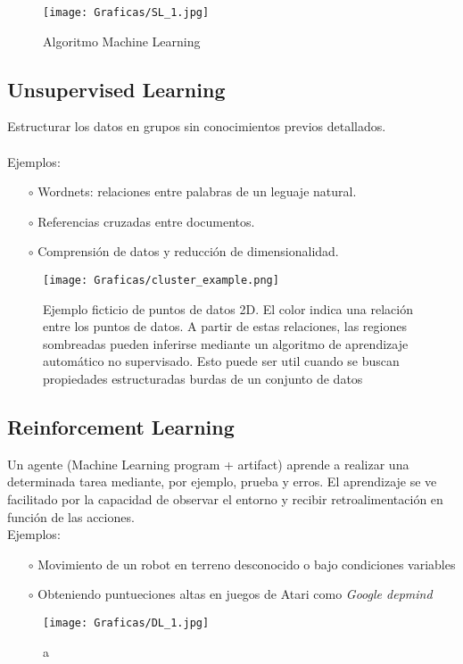 \documentclass[12pt,a4paper]{book}
\begin{document}
\begin{figure}[hbtp]
\centering
\texttt{[image: Graficas/SL\_1.jpg]}
\caption{Algoritmo Machine Learning}
\end{figure}

\subsection{Unsupervised Learning}
Estructurar los datos en grupos sin conocimientos previos detallados.\\
\\
Ejemplos:
\begin{enumerate}
 \item[$\circ$] Wordnets: relaciones entre palabras de un leguaje natural.
 \item[$\circ$] Referencias cruzadas entre documentos.
 \item[$\circ$] Comprensión de datos y reducción de dimensionalidad.
\end{enumerate}

\begin{figure}[hbtp]
\centering
\texttt{[image: Graficas/cluster\_example.png]}
\caption{Ejemplo ficticio de puntos de datos 2D. El color indica una relación entre los puntos de datos. A partir de estas relaciones, las regiones sombreadas pueden inferirse mediante un algoritmo de aprendizaje automático no supervisado. Esto puede ser util cuando se buscan propiedades estructuradas burdas de un conjunto de datos}
\end{figure}
\subsection{Reinforcement Learning}
Un agente (Machine Learning program + artifact) aprende a realizar una determinada tarea mediante, por ejemplo, prueba y erros. El aprendizaje se ve facilitado por la capacidad de observar el entorno y recibir retroalimentación en función de las acciones.\\
Ejemplos:
\begin{enumerate}
 \item[$\circ$] Movimiento de un robot en terreno desconocido o bajo condiciones variables
 \item[$\circ$] Obteniendo puntueciones altas en juegos de Atari como \textsl{Google depmind}
\end{enumerate}

\begin{figure}[hbtp]
\centering
\texttt{[image: Graficas/DL\_1.jpg]}
\caption{a}
\end{figure}
\end{document}
